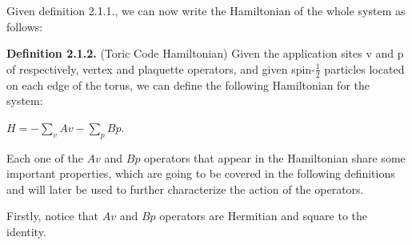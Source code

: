 \documentclass[12pt]{report}
\begin{document}
\begin{minipage}{1\textwidth}
\begin{center}
		\end{center}
		
		Given definition 2.1.1., we can now write the Hamiltonian of the whole system as follows:\newline
		
		\textbf{Definition 2.1.2.} (Toric Code Hamiltonian) Given the application sites v and p of  respectively, vertex and plaquette operators, and given spin-$\frac{1}{2}$ particles located on each edge of the torus, we can define the following Hamiltonian for the system:\newline
		
		\begin{center}
			
			$H = -\sum_{v} 
			Av - \sum_{p} Bp $.\newline
			
		\end{center}
		
		Each one of the $Av$ and $Bp$ operators that appear in the Hamiltonian share some important properties, which are going to be covered in the following definitions and will later be used to further characterize the action of the operators. \newline
		
		
		Firstly, notice that $Av$ and $Bp$ operators are Hermitian and square to the identity. \newline
		
	\end{minipage}  
	
\end{document}
